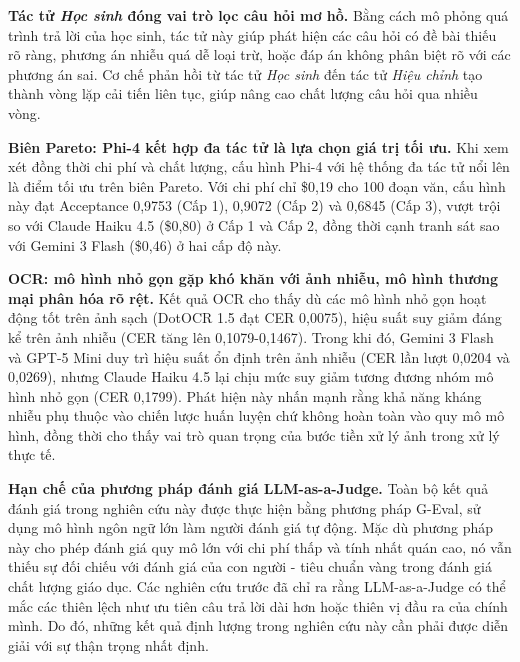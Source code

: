 \textbf{Tác tử \textit{Học sinh} đóng vai trò lọc câu hỏi mơ hồ.} Bằng cách mô phỏng quá trình trả lời của học sinh, tác tử này giúp phát hiện các câu hỏi có đề bài thiếu rõ ràng, phương án nhiễu quá dễ loại trừ, hoặc đáp án không phân biệt rõ với các phương án sai. Cơ chế phản hồi từ tác tử \textit{Học sinh} đến tác tử \textit{Hiệu chỉnh} tạo thành vòng lặp cải tiến liên tục, giúp nâng cao chất lượng câu hỏi qua nhiều vòng.

\textbf{Biên Pareto: Phi-4 kết hợp đa tác tử là lựa chọn giá trị tối ưu.} Khi xem xét đồng thời chi phí và chất lượng, cấu hình Phi-4 với hệ thống đa tác tử nổi lên là điểm tối ưu trên biên Pareto. Với chi phí chỉ \$0,19 cho 100 đoạn văn, cấu hình này đạt Acceptance 0,9753 (Cấp 1), 0,9072 (Cấp 2) và 0,6845 (Cấp 3), vượt trội so với Claude Haiku 4.5 (\$0,80) ở Cấp 1 và Cấp 2, đồng thời cạnh tranh sát sao với Gemini 3 Flash (\$0,46) ở hai cấp độ này.

\textbf{OCR: mô hình nhỏ gọn gặp khó khăn với ảnh nhiễu, mô hình thương mại phân hóa rõ rệt.} Kết quả OCR cho thấy dù các mô hình nhỏ gọn hoạt động tốt trên ảnh sạch (DotOCR 1.5 đạt CER 0,0075), hiệu suất suy giảm đáng kể trên ảnh nhiễu (CER tăng lên 0,1079-0,1467). Trong khi đó, Gemini 3 Flash và GPT-5 Mini duy trì hiệu suất ổn định trên ảnh nhiễu (CER lần lượt 0,0204 và 0,0269), nhưng Claude Haiku 4.5 lại chịu mức suy giảm tương đương nhóm mô hình nhỏ gọn (CER 0,1799). Phát hiện này nhấn mạnh rằng khả năng kháng nhiễu phụ thuộc vào chiến lược huấn luyện chứ không hoàn toàn vào quy mô mô hình, đồng thời cho thấy vai trò quan trọng của bước tiền xử lý ảnh trong xử lý thực tế.

\textbf{Hạn chế của phương pháp đánh giá LLM-as-a-Judge.} Toàn bộ kết quả đánh giá trong nghiên cứu này được thực hiện bằng phương pháp G-Eval, sử dụng mô hình ngôn ngữ lớn làm người đánh giá tự động. Mặc dù phương pháp này cho phép đánh giá quy mô lớn với chi phí thấp và tính nhất quán cao, nó vẫn thiếu sự đối chiếu với đánh giá của con người - tiêu chuẩn vàng trong đánh giá chất lượng giáo dục. Các nghiên cứu trước đã chỉ ra rằng LLM-as-a-Judge có thể mắc các thiên lệch như ưu tiên câu trả lời dài hơn hoặc thiên vị đầu ra của chính mình. Do đó, những kết quả định lượng trong nghiên cứu này cần phải được diễn giải với sự thận trọng nhất định.
